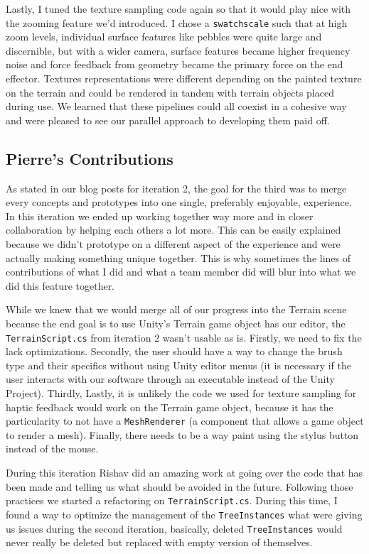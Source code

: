 Lastly, I tuned the texture sampling code again so that it would play nice with the zooming feature we’d introduced. I chose a \texttt{swatchscale} such that at high zoom levels, individual surface features like pebbles were quite large and discernible, but with a wider camera, surface features became higher frequency noise and force feedback from geometry became the primary force on the end effector. Textures representations were different depending on the painted texture on the terrain and could be rendered in tandem with terrain objects placed during use. We learned that these pipelines could all coexist in a cohesive way and were pleased to see our parallel approach to developing them paid off.

\subsection{Pierre's Contributions}
As stated in our blog posts for iteration 2, the goal for the third was to merge every concepts and prototypes into one single, preferably enjoyable, experience. In this iteration we ended up working together way more and in closer collaboration by helping each others a lot more. This can be easily explained because we didn’t prototype on a different aspect of the experience and were actually making something unique together. This is why sometimes the lines of contributions of what I did and what a team member did will blur into what we did this feature together.

While we knew that we would merge all of our progress into the Terrain scene because the end goal is to use Unity’s Terrain game object has our editor, the \texttt{TerrainScript.cs} from iteration 2 wasn’t usable as is. Firstly, we need to fix the lack optimizations. Secondly, the user should have a way to change the brush type and their specifics without using Unity editor menus (it is necessary if the user interacts with our software through an executable instead of the Unity Project). Thirdly, Lastly, it is unlikely the code we used for texture sampling for haptic feedback would work on the Terrain game object, because it has the particularity to not have a \texttt{MeshRenderer} (a component that allows a game object to render a mesh). Finally, there needs to be a way paint using the stylus button instead of the mouse.

During this iteration Rishav did an amazing work at going over the code that has been made and telling us what should be avoided in the future. Following those practices we started a refactoring on \texttt{TerrainScript.cs}.  During this time, I found a way to optimize the management of the \texttt{TreeInstances} what were giving us issues during the second iteration, basically, deleted \texttt{TreeInstances} would never really be deleted but replaced with empty version of themselves.


